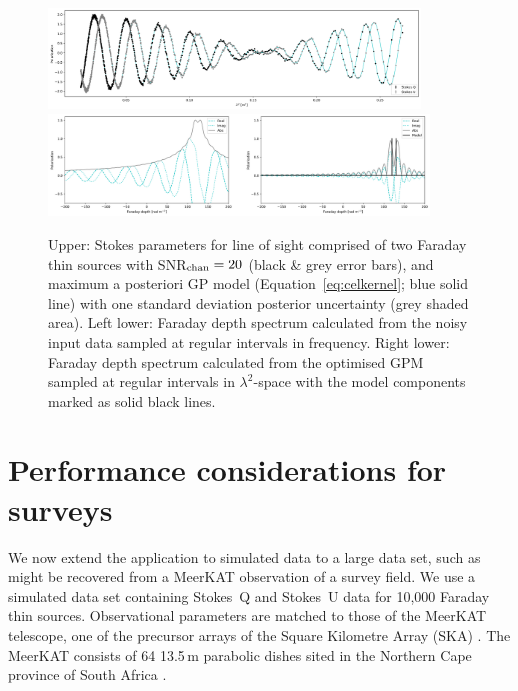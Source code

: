 \documentclass[fleqn,usenatbib]{mnras}
\begin{document}
\begin{figure}
\includegraphics[width=0.88\textwidth]{./FIGURES/double_qu.png}
\includegraphics[width=0.9\textwidth]{./FIGURES/diff_double.png}
\caption{\label{fig:double} Upper: Stokes parameters for line of sight comprised of two Faraday thin sources with SNR$_{\rm chan}=20$ (black \& grey error bars), and maximum a posteriori GP model (Equation~\ref{eq:celkernel}; blue solid line) with one standard deviation posterior uncertainty (grey shaded area). Left lower: Faraday depth spectrum calculated from the noisy input data sampled at regular intervals in frequency. Right lower: Faraday depth spectrum calculated from the optimised GPM sampled at regular intervals in $\lambda^2$-space with the model components marked as solid black lines.}
\end{figure}
 

\section{Performance considerations for surveys}
\label{sec:joedata}

We now extend the application to simulated data to a large data set, such as might be recovered from a MeerKAT observation of a survey field. We use a simulated data set containing Stokes~Q and Stokes~U data for 10,000 Faraday thin sources. Observational parameters are matched to those of the MeerKAT telescope, one of the precursor arrays of the Square Kilometre Array (SKA) \citep{5136190, 2009IEEEP..97.1522J}. The MeerKAT consists of 64 13.5\,m parabolic dishes sited in the Northern Cape province of South Africa \citep{Justin,Taylor_2017}. %

\end{document}
